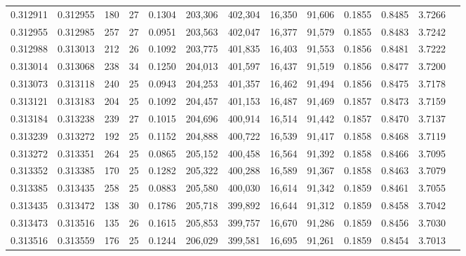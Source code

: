 \begin{tabular}{rrrrrrrrrrrrr}
0.312911 & 0.312955 &   180 &  27 &                                     0.1304 & 203,306 & 402,304 &  16,350 &  91,606 & 0.1855 & 0.8485 & 3.7266 \\
0.312955 & 0.312985 &   257 &  27 &                                     0.0951 & 203,563 & 402,047 &  16,377 &  91,579 & 0.1855 & 0.8483 & 3.7242 \\
0.312988 & 0.313013 &   212 &  26 &                                     0.1092 & 203,775 & 401,835 &  16,403 &  91,553 & 0.1856 & 0.8481 & 3.7222 \\
0.313014 & 0.313068 &   238 &  34 &                                     0.1250 & 204,013 & 401,597 &  16,437 &  91,519 & 0.1856 & 0.8477 & 3.7200 \\
0.313073 & 0.313118 &   240 &  25 &                                     0.0943 & 204,253 & 401,357 &  16,462 &  91,494 & 0.1856 & 0.8475 & 3.7178 \\
0.313121 & 0.313183 &   204 &  25 &                                     0.1092 & 204,457 & 401,153 &  16,487 &  91,469 & 0.1857 & 0.8473 & 3.7159 \\
0.313184 & 0.313238 &   239 &  27 &                                     0.1015 & 204,696 & 400,914 &  16,514 &  91,442 & 0.1857 & 0.8470 & 3.7137 \\
0.313239 & 0.313272 &   192 &  25 &                                     0.1152 & 204,888 & 400,722 &  16,539 &  91,417 & 0.1858 & 0.8468 & 3.7119 \\
0.313272 & 0.313351 &   264 &  25 &                                     0.0865 & 205,152 & 400,458 &  16,564 &  91,392 & 0.1858 & 0.8466 & 3.7095 \\
0.313352 & 0.313385 &   170 &  25 &                                     0.1282 & 205,322 & 400,288 &  16,589 &  91,367 & 0.1858 & 0.8463 & 3.7079 \\
0.313385 & 0.313435 &   258 &  25 &                                     0.0883 & 205,580 & 400,030 &  16,614 &  91,342 & 0.1859 & 0.8461 & 3.7055 \\
0.313435 & 0.313472 &   138 &  30 &                                     0.1786 & 205,718 & 399,892 &  16,644 &  91,312 & 0.1859 & 0.8458 & 3.7042 \\
0.313473 & 0.313516 &   135 &  26 &                                     0.1615 & 205,853 & 399,757 &  16,670 &  91,286 & 0.1859 & 0.8456 & 3.7030 \\
0.313516 & 0.313559 &   176 &  25 &                                     0.1244 & 206,029 & 399,581 &  16,695 &  91,261 & 0.1859 & 0.8454 & 3.7013 \\

\end{tabular}
